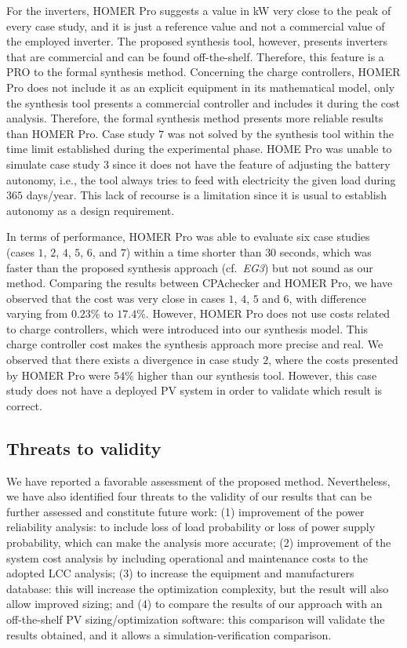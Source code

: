 \documentclass[runningheads]{llncs}
\begin{document}
For the inverters, HOMER Pro suggests a value in kW very close to the peak of every case study, and it is just a reference value and not a commercial value of the employed inverter. The proposed synthesis tool, however, presents inverters that are commercial and can be found off-the-shelf. Therefore, this feature is a PRO to the formal synthesis method. Concerning the charge controllers, HOMER Pro does not include it as an explicit equipment in its mathematical model, only the synthesis tool presents a commercial controller and includes it during the cost analysis. Therefore, the formal synthesis method presents more reliable results than HOMER Pro. Case study $7$ was not solved by the synthesis tool within the time limit established during the experimental phase. HOME Pro was unable to simulate case study $3$ since it does not have the feature of adjusting the battery autonomy, i.e., the tool always tries to feed with electricity the given load during $365$ days/year. This lack of recourse is a limitation since it is usual to establish autonomy as a design requirement.

In terms of performance, HOMER Pro was able to evaluate six case studies (cases $1$, $2$, $4$, $5$, $6$, and $7$) within a time shorter than $30$ seconds, which was faster than the proposed synthesis approach (cf.~\textit{EG3}) but not sound as our method.  
Comparing the results between CPAchecker and HOMER Pro, we have observed that the cost was very close in cases $1$, $4$, $5$ and $6$, with difference varying from $0.23$\% to $17.4$\%. However, HOMER Pro does not use costs related to charge controllers, which were introduced into our synthesis model. This charge controller cost makes the synthesis approach more precise and real. We observed that there exists a divergence in case study $2$, where the costs presented by HOMER Pro were $54$\% higher than our synthesis tool. However, this case study does not have a deployed PV system in order to validate which result is correct.

\subsection{Threats to validity} 

We have reported a favorable assessment of the proposed method. Nevertheless, we have also identified four threats to the validity of our results that can be further assessed and constitute future work: (1) improvement of the power reliability analysis: to include loss of load probability or loss of power supply probability, which can make the analysis more accurate; (2) improvement of the system cost analysis by including operational and maintenance costs to the adopted LCC analysis; (3) to increase the equipment and manufacturers database: this will increase the optimization complexity, but the result will also allow improved sizing; and (4) to compare the results of our approach with an off-the-shelf PV sizing/optimization software: this comparison will validate the results obtained, and it allows a simulation-verification comparison.
\end{document}
